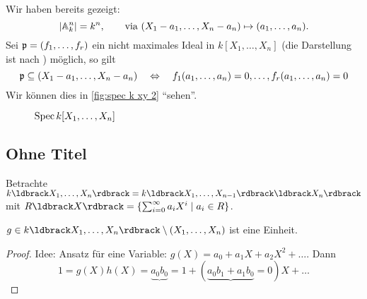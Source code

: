 Wir haben bereits gezeigt:
\[
	|\mathbb{A}_k^n| = k^n, \qquad\text{via } 
		(X_1-a_1,\ldots,X_n-a_n) \mapsto (a_1,\ldots,a_n).
\]
Sei $\mathfrak{p} = (f_1, \ldots, f_r)$ ein nicht maximales Ideal in $k[X_1,\ldots,X_n]$
(die Darstellung ist nach ) möglich,
so gilt
\[
	\mathfrak{p} \subseteq (X_1 - a_1, \ldots, X_n - a_n)
	\quad\Leftrightarrow\quad
	f_1(a_1,\ldots,a_n) = 0, \ldots,
	f_r(a_1,\ldots,a_n) = 0
\]
Wir können dies in \autoref{fig:spec k xy 2} "`sehen"'.

\begin{figure}\centering
	\caption{$\operatorname{Spec} k[X_1,\ldots,X_n]$}
	\label{fig:spec k xy 2}
\end{figure}

\subsection{Ohne Titel}
Betrachte $k\ldbrack X_1, \ldots, X_n\rdbrack = 
	k\ldbrack X_1,\ldots,X_{n-1}\rdbrack\ldbrack X_n\rdbrack$
mit $R\ldbrack X\rdbrack = \{\sum_{i=0}^\infty a_i X^i \mid a_i \in R\}$.

\begin{bemerkung}
	$g \in k\ldbrack X_1, \ldots, X_n\rdbrack \setminus (X_1,\ldots,X_n)$
	ist eine Einheit.
\end{bemerkung}
\begin{proof}
	Idee: Ansatz für eine Variable:
	$g(X) = a_0 + a_1X + a_2X^2+ \ldots$. Dann
	\[
		1 = g(X)h(X) = 
		\underbrace{a_0 b_0}{= 1} + 
		(\underbrace{a_0b_1+a_1b_0}{= 0})X + \ldots
	\] 
\end{proof}

